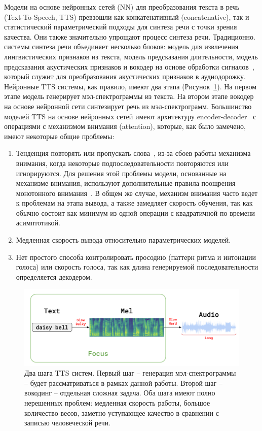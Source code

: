 Модели на основе нейронных сетей (NN) для преобразования текста в речь (Text-To-Speech, TTS) превзошли как конкатенативный (concatenative), так и статистический параметрический подходы для синтеза речи с точки зрения качества. Они также значительно упрощают процесс синтеза речи. Традиционно. системы синтеза речи объединяет несколько блоков: модель для извлечения лингвистических признаков из текста, модель предсказания длительности, модель предсказания акустических признаков и вокодер на основе обработки сигналов~\cite{taylor}, который служит для преобразования акустических признаков в аудиодорожку. Нейронные TTS системы, как правило, имеют два этапа (Рисунок~\ref{fig:tts-pipeline}). На первом этапе модель генерирует мэл-спектрограммы из текста. На втором этапе вокодер на основе нейронной сети синтезирует речь из мэл-спектрограмм. Большинство моделей TTS на основе нейронных сетей имеют архитектуру encoder-decoder~\cite{bahdanau} с операциями с механизмом внимания (attention), которые, как было замечено, имеют некоторые общие проблемы:
\begin{enumerate}
    \item Тенденция повторять или пропускать слова~\cite{fastspeech}, из-за сбоев работы механизма внимания, когда некоторые подпоследовательности повторяются или игнорируются. Для решения этой проблемы модели, основанные на механизме внимания, используют дополнительные правила поощрения монотонного внимания~\cite{tacotron2, deepvoice3, taigman2017}. В общем же случае, механизм внимания часто ведет к проблемам на этапа вывода, а также замедляет скорость обучения, так как обычно состоит как минимум из одной операции с квадратичной по времени асимптотикой.
    \item Медленная скорость вывода относительно параметрических моделей.
    \item Нет простого способа контролировать просодию (паттерн ритма и интонации голоса) или скорость голоса, так как длина генерируемой последовательности определяется декодером.
\end{enumerate}

\begin{figure}[!ht]
\centering
\includegraphics[width=1.0\textwidth]{images/tts-pipeline.png}
\caption{Два шага TTS систем. Первый шаг -- генерация мэл-спектрограммы -- будет рассматриваться в рамках данной работы. Второй шаг -- вокодинг -- отдельная сложная задача. Оба шага имеют полно нерешенных проблем: медленная скорость работы, большое количество весов, заметно уступающее качество в сравнении с записью человеческой речи.}
\label{fig:tts-pipeline}
\end{figure}

